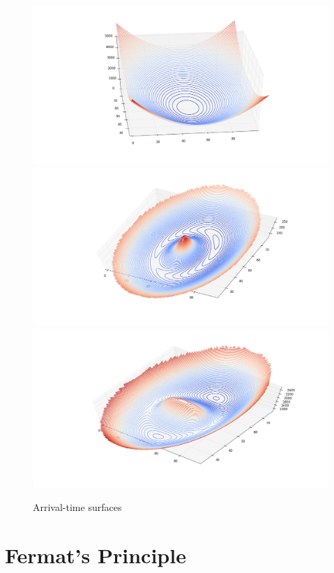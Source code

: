 \begin{figure}
\includegraphics[height=.3\vsize]{fig/arriv1.png}
\includegraphics[height=.3\vsize]{fig/arriv2.png}
\includegraphics[height=.3\vsize]{fig/arriv3.png}
\caption{Arrival-time surfaces\label{fig:arriv}}
\end{figure}

\section{Fermat's Principle} \label{sec:Fermat}

